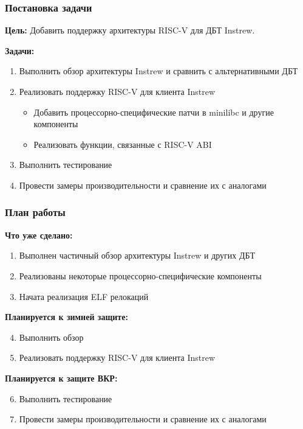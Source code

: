\documentclass{vkr-slides-style}
\begin{document}
\begin{frame}
    \frametitle{Постановка задачи}
    \textbf{Цель:} Добавить поддержку архитектуры RISC-V для ДБТ Instrew.

    \vspace{5mm}
    \textbf{Задачи:}
    \begin{enumerate}
        \item Выполнить обзор архитектуры Instrew и сравнить с альтернативными ДБТ
        \item Реализовать поддержку RISC-V для клиента Instrew
              \begin{itemize}
                  \item Добавить процессорно-специфические патчи в minilibc и другие компоненты
                  \item Реализовать функции, связанные с RISC-V ABI
              \end{itemize}
        \item Выполнить тестирование
        \item Провести замеры производительности и сравнение их с аналогами
    \end{enumerate}
\end{frame}

\begin{frame}
    \frametitle{План работы}

    \textbf{Что уже сделано:}
    \begin{enumerate}
        \item Выполнен частичный обзор архитектуры Instrew и других ДБТ
        \item Реализованы некоторые процессорно-специфические компоненты
        \item Начата реализация ELF релокаций
    \end{enumerate}

    \textbf{Планируется к зимней защите:}
    \begin{enumerate}
        \setcounter{enumi}{3}
        \item Выполнить обзор
        \item Реализовать поддержку RISC-V для клиента Instrew
    \end{enumerate}

    \textbf{Планируется к защите ВКР:}
    \begin{enumerate}
        \setcounter{enumi}{5}
        \item Выполнить тестирование
        \item Провести замеры производительности и сравнение их с аналогами
    \end{enumerate}
\end{frame}
\end{document}
